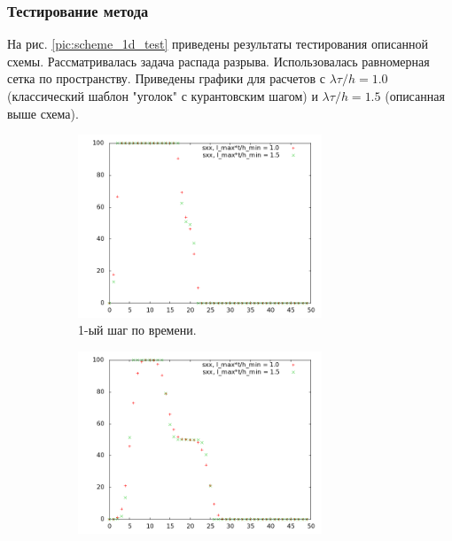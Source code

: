 \clearpage
\newpage

\subsubsection{Тестирование метода}

На рис. \ref{pic:scheme_1d_test} приведены результаты тестирования описанной схемы. Рассматривалась задача распада разрыва. Использовалась равномерная сетка по пространству. Приведены графики для расчетов с $\lambda \tau / h = 1.0$ (классический шаблон "уголок" с курантовским шагом) и $\lambda \tau / h = 1.5$ (описанная выше схема).

\begin{figure}[htp]
\begin{subfigure}[b]{0.5\textwidth}
\centering
\includegraphics[width=0.8\textwidth]{png/big-sigma-test-results-1d/snap-1.png}
\caption{1-ый шаг по времени.}
\end{subfigure}
\begin{subfigure}[b]{0.5\textwidth}
\centering
\includegraphics[width=0.8\textwidth]{png/big-sigma-test-results-1d/snap-3.png}

\end{subfigure}
\end{figure}
